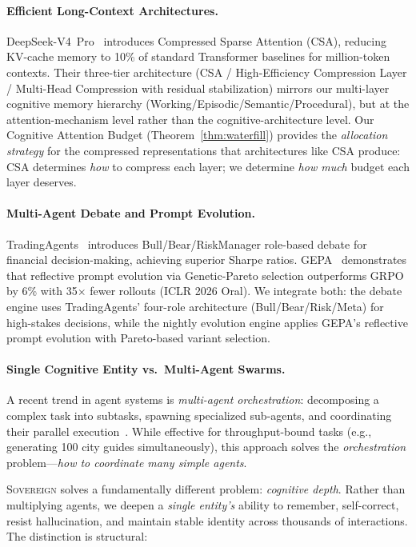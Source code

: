 \documentclass[11pt,a4paper]{article}
\begin{document}
\paragraph{Efficient Long-Context Architectures.}
DeepSeek-V4~Pro~\cite{deepseek_v4_2026} introduces Compressed Sparse Attention
(CSA), reducing KV-cache memory to 10\% of standard Transformer baselines for
million-token contexts. Their three-tier architecture (CSA / High-Efficiency
Compression Layer / Multi-Head Compression with residual stabilization) mirrors
our multi-layer cognitive memory hierarchy
(Working/Episodic/Semantic/Procedural), but at the attention-mechanism level
rather than the cognitive-architecture level. Our Cognitive Attention Budget
(Theorem~\ref{thm:waterfill}) provides the \emph{allocation strategy} for\linebreak
the compressed representations that architectures like CSA produce: CSA
determines \emph{how} to compress each layer; we determine \emph{how much}
budget each layer deserves.

\paragraph{Multi-Agent Debate and Prompt Evolution.}
TradingAgents~\cite{tradingagents} introduces Bull/\allowbreak Bear/\allowbreak RiskManager
role-based debate for financial decision-making, achieving superior Sharpe
ratios.
GEPA~\cite{gepa} demonstrates that reflective prompt evolution via
Genetic-Pareto selection outperforms GRPO by 6\% with 35$\times$ fewer
rollouts (ICLR 2026 Oral). We integrate both: the debate engine uses
TradingAgents' four-role architecture (Bull/Bear/Risk/Meta) for high-stakes
decisions, while the nightly evolution engine applies GEPA's reflective
prompt evolution with Pareto-based variant selection.

\paragraph{Single Cognitive Entity vs.\ Multi-Agent Swarms.}
A recent trend in agent systems is \emph{multi-agent orchestration}:
decomposing a complex task into subtasks, spawning specialized sub-agents,
and coordinating their parallel execution~\cite{react}.
While effective for throughput-bound tasks (e.g., generating 100 city
guides simultaneously), this approach solves the \emph{orchestration}
problem---\emph{how to coordinate many simple agents}.

\textsc{Sovereign} solves a fundamentally different problem:
\emph{cognitive depth}. Rather than multiplying agents, we deepen a
\emph{single entity's} ability to remember, self-correct, resist
hallucination, and maintain stable identity across thousands of
interactions. The distinction is structural:
\end{document}

